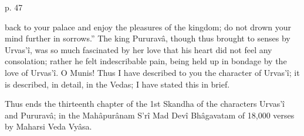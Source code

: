  

p. 47

 

back to your palace and enjoy the pleasures of the kingdom; do not drown your mind further in sorrows.” The king Pururavâ, though thus brought to senses by Urvas’î, was so much fascinated by her love that his heart did not feel any consolation; rather he felt indescribable pain, being held up in bondage by the love of Urvas’î. O Munis! Thus I have described to you the character of Urvas’î; it is described, in detail, in the Vedas; I have stated this in brief.

 

Thus ends the thirteenth chapter of the 1st Skandha of the characters Urvas’î and Pururavâ; in the Mahâpurânam S’rî Mad Devî Bhâgavatam of 18,000 verses by Maharsi Veda Vyâsa.